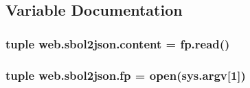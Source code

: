 \subsection{Variable Documentation}
\hypertarget{namespaceweb_1_1sbol2json_ab3d456638be71c04a94c486b3adfefda}{
\subsubsection[{content}]{\setlength{\rightskip}{0pt plus 5cm}tuple web.\-sbol2json.\-content = fp.\-read()}}\label{namespaceweb_1_1sbol2json_ab3d456638be71c04a94c486b3adfefda}
\hypertarget{namespaceweb_1_1sbol2json_a5af797a63324777244a14096342e467d}{
\subsubsection[{fp}]{\setlength{\rightskip}{0pt plus 5cm}tuple web.\-sbol2json.\-fp = open(sys.\-argv\mbox{[}1\mbox{]})}}\label{namespaceweb_1_1sbol2json_a5af797a63324777244a14096342e467d}
